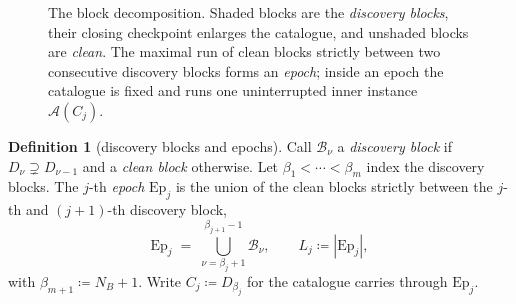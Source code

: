 \documentclass[letterpaper,9pt,twocolumn]{extarticle}
\newcommand{\cB}{\mathcal{B}}
\newcommand{\Ep}{\mathrm{Ep}}
\theoremstyle{plain}
\theoremstyle{definition}
\newtheorem{definition}[theorem]{Definition}
\theoremstyle{remark}
\begin{document}
\begin{figure}[t]
\centering
{}
\caption{The block decomposition. Shaded blocks are the \emph{discovery
blocks}, their closing checkpoint enlarges the catalogue, and
unshaded blocks are \emph{clean}. The maximal run of clean blocks
strictly between two consecutive discovery blocks forms an \emph{epoch};
inside an epoch the catalogue is fixed and  runs one
uninterrupted inner instance $\mathcal{A}(C_j)$.}
\label{fig:blocks}
\end{figure}

\begin{definition}[discovery blocks and epochs]
\label{def:blocks}
Call $\cB_\nu$ a \emph{discovery block} if $D_\nu\supsetneq D_{\nu-1}$
and a \emph{clean block} otherwise. Let $\beta_1<\cdots<\beta_m$ index
the discovery blocks. The $j$-th \emph{epoch} $\Ep_j$ is the union of
the clean blocks strictly between the $j$-th and $(j{+}1)$-th discovery
block,
\begin{equation}
\Ep_j\;=\;\bigcup_{\nu=\beta_j+1}^{\beta_{j+1}-1}\cB_\nu,
\qquad L_j\coloneqq|\Ep_j|,
\label{eq:block-epoch}
\end{equation}
with $\beta_{m+1}\coloneqq N_B+1$. Write $C_j\coloneqq D_{\beta_j}$ for
the catalogue  carries through $\Ep_j$.
\end{definition}
\end{document}
